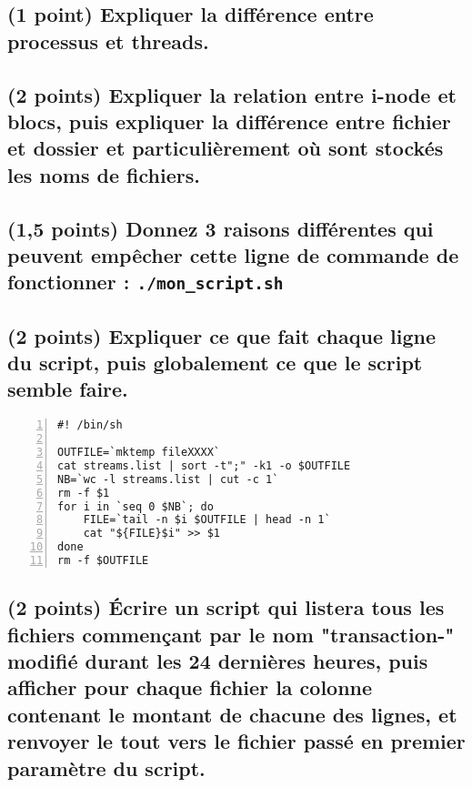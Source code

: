 \documentclass[11pt,a4paper]{article}
\newcommand{\TTBF}[1]{\texttt{\textbf{#1}}}
\begin{document}
\bigskip

\pagebreak

\subsection{(1 point) Expliquer la différence entre processus et threads.}

\bigskip

\subsection{(2 points) Expliquer la relation entre i-node et blocs, puis expliquer la différence entre fichier et dossier et particulièrement où sont stockés les noms de fichiers.}

\bigskip

\subsection{(1,5 points) Donnez 3 raisons différentes qui peuvent empêcher cette ligne de commande de fonctionner : \TTBF{./mon\_script.sh}}

\bigskip

\subsection{(2 points) Expliquer ce que fait chaque ligne du script, puis globalement ce que le script semble faire.}

\bigskip

\lstset{language=sh}
\begin{lstlisting}[frame=single,numbers=left,title={script.sh}]
#! /bin/sh

OUTFILE=`mktemp fileXXXX`
cat streams.list | sort -t";" -k1 -o $OUTFILE
NB=`wc -l streams.list | cut -c 1`
rm -f $1
for i in `seq 0 $NB`; do
	FILE=`tail -n $i $OUTFILE | head -n 1`
	cat "${FILE}$i" >> $1
done
rm -f $OUTFILE

\end{lstlisting}

\bigskip


\subsection{(2 points) \'Ecrire un script qui listera tous les fichiers commençant par le nom "transaction-" modifié durant les 24 dernières heures, puis afficher pour chaque fichier la colonne contenant le montant de chacune des lignes, et renvoyer le tout vers le fichier passé en premier paramètre du script.}
\end{document}
